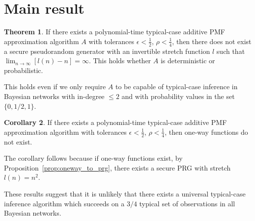 \documentclass{article}
\theoremstyle{definition}
\newtheorem{defn}{Definition}
\newtheorem{thm}{Theorem}
\newtheorem{cor}[thm]{Corollary}
\theoremstyle{remark}
\begin{document}
\section{Main result}

\begin{thm} \label{thm:main}
If there exists a polynomial-time typical-case additive PMF approximation algorithm $A$ with tolerances $\epsilon < \frac{1}{2}$, $\rho < \frac{1}{4}$,
then there does not exist a secure pseudorandom generator with an invertible stretch function $l$ such that $\lim_{n \to \infty}[l(n) - n] = \infty$.
This holds whether $A$ is deterministic or probabilistic.

\smallskip \noindent This holds even if we only require $A$ to be capable of typical-case inference in Bayesian networks with in-degree $\leq 2$ and with probability values in the set $\{0, 1/2, 1\}$.
\end{thm}

\begin{cor}
If there exists a polynomial-time typical-case additive PMF approximation algorithm with tolerances $\epsilon < \frac{1}{2}$, $\rho < \frac{1}{4}$,
then one-way functions do not exist.
\end{cor}
\noindent The corollary follows because if one-way functions exist, by Proposition~\ref{prop:oneway_to_prg}, there exists a secure PRG with stretch $l(n) = n^2$.


\smallskip
\noindent These results suggest that it is unlikely that there exists a universal typical-case inference algorithm which succeeds on a $3/4$ typical set of observations in all Bayesian networks.
\end{document}
